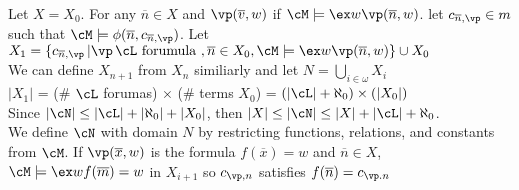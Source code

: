 \begin{pf}
    Let $X = X_0$. For any $\overline{n} \in X$ and $\vp(\overline{v},w)$ if $\cM \models \ex w \vp(\overline{n},w)$. let $c_{\overline{n},\vp} \in m$ such that $\cM \models \phi(\overline{n},c_{\overline{n}, \vp})$. Let $X_1 = \{c_{\overline{n}, \vp} \, | \vp \, \cL \text{ forumula }, \overline{n} \in X_0, \cM \models \ex w \vp(\overline{n},w)\} \cup X_0$ \\
    We can define $X_{n+1}$ from $X_n$ similiarly and let $N = \bigcup_{i \in \omega}X_i$ \\
    $|X_1|$ = (\# $\cL$ forumas) $\times$ (\# terms $X_0$) = $(|\cL| + \aleph_0) \times (|X_0|)$ \\
    Since $|\cN| \le |\cL| + |\aleph_0| + |X_0|$, then $|X| \le |\cN| \le |X| + |\cL| + \aleph_0$. \\
    We define $\cN$ with domain $N$ by restricting functions, relations, and constants from $\cM$. If $\vp(\overline{x}, w)$ is the formula $f(\overline{x})=w$ and $\overline{n} \in X$, $\cM \models \ex w f(\overline{m})=w$ in $X_{i+1}$ so $c_{\vp, n}$ satisfies $f(\overline{n}) = c_{\vp. n}$ 
\end{pf}
